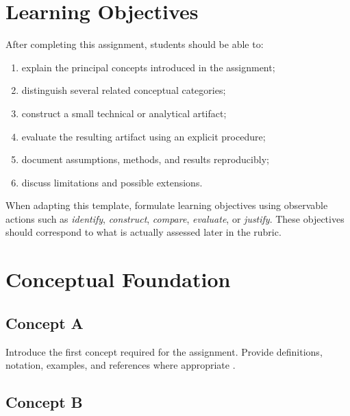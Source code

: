 \documentclass[11pt]{article}
\begin{document}
\section{Learning Objectives}

After completing this assignment, students should be able to:

\begin{enumerate}
    \item explain the principal concepts introduced in the assignment;
    \item distinguish several related conceptual categories;
    \item construct a small technical or analytical artifact;
    \item evaluate the resulting artifact using an explicit procedure;
    \item document assumptions, methods, and results reproducibly;
    \item discuss limitations and possible extensions.
\end{enumerate}

\begin{tutornote}
When adapting this template, formulate learning objectives using observable
actions such as \emph{identify}, \emph{construct}, \emph{compare},
\emph{evaluate}, or \emph{justify}. These objectives should correspond to
what is actually assessed later in the rubric.
\end{tutornote}

\section{Conceptual Foundation}

\subsection*{Concept A}

Introduce the first concept required for the assignment. Provide definitions,
notation, examples, and references where appropriate
\cite{example_reference}.

\subsection*{Concept B}
\end{document}
